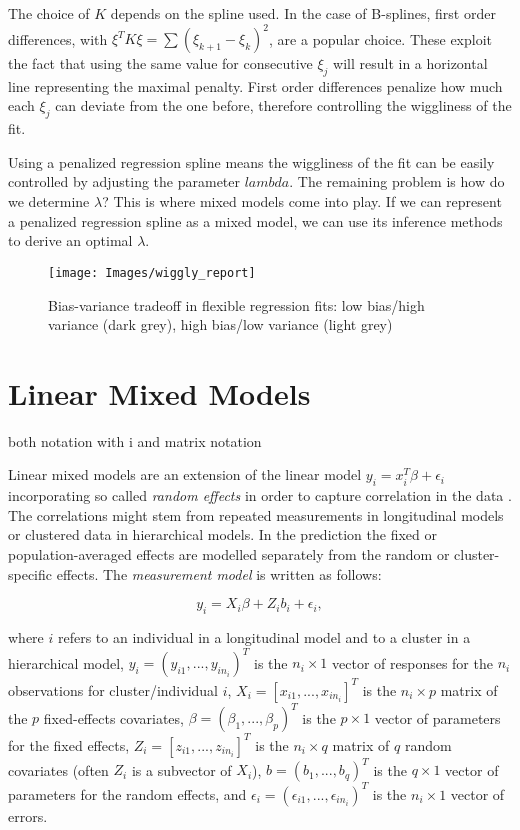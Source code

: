 \documentclass[12pt]{article}
\begin{document}
The choice of $K$ depends on the spline used. In the case of B-splines, first order differences, with $\xi^TK\xi = \sum(\xi_{k+1} - \xi_{k})^2$, are a popular choice. These exploit the fact that using the same value for consecutive $\xi_j$ will result in a horizontal line representing the maximal penalty. First order differences penalize how much each $\xi_j$ can deviate from the one before, therefore controlling the wiggliness of the fit.

Using a penalized regression spline means the wiggliness of the fit can be easily controlled by adjusting the parameter $lambda$. The remaining problem is how do we determine $\lambda$? This is where mixed models come into play. If we can represent a penalized regression spline as a mixed model, we can use its inference methods to derive an optimal $\lambda$.


\begin{figure}
\begin{center}
\texttt{[image: Images/wiggly\_report]}
\end{center}
\vspace{-2em}
\caption[caption]{Bias-variance tradeoff in flexible regression fits: low bias/high variance (dark grey), high bias/low variance (light grey)}\label{wiggly}
\end{figure}



\section{Linear Mixed Models}
both notation with i and matrix notation

Linear mixed models are an extension of the linear model $y_i = x^T_i\beta +\epsilon_i$ incorporating so called \textit{random effects} in order to capture correlation in the data \cite{fahrmeir2013regression}. The correlations might stem from repeated measurements in longitudinal models or clustered data in hierarchical models. In the prediction the fixed or population-averaged effects are modelled separately from the random or cluster-specific effects. The \textit{measurement model} is written as follows:

$$y_i = X_i \beta + Z_i b_i + \epsilon_i,$$

where $i$ refers to an individual in a longitudinal model and to a cluster in a
hierarchical model, $y_i = ( y_{i1},...,y_{in_i} )^T$ is the $n_i \times 1$ vector of responses for the $n_i$ observations for cluster/individual $i$, $X_i = \left[ x_{i1},..., x_{in_i}\right]^T$ is the $n_i \times p$ matrix of the $p$ fixed-effects covariates, $\beta = (\beta_1,...,\beta_p)^T$ is the $p\times1$ vector of parameters for the fixed effects, $Z_i = \left[z_{i1},...,z_{in_i}\right]^T$ is the $n_i\times q$ matrix of $q$ random covariates (often $Z_i$ is a subvector of $X_i$), $b = (b_1,...,b_q)^T$ is the $q\times1$ vector of parameters for the random effects, and $\epsilon_i = (\epsilon_{i1},...,\epsilon_{in_i})^T$ is the $n_i\times1$ vector of errors. 
\end{document}
